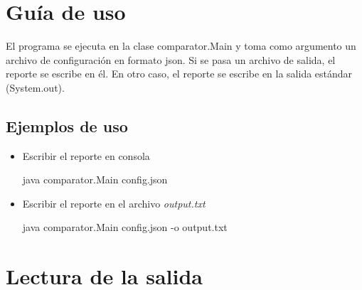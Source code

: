 \documentclass[11pt]{article}
\begin{document}
       \section{Guía de uso}

       El programa se ejecuta en la clase comparator.Main y toma como argumento un archivo de configuración en formato json. Si se pasa un archivo de salida, el reporte se escribe en él. En otro caso, el reporte se escribe en la salida estándar (System.out).

       \subsection{Ejemplos de uso}

       \begin{itemize}
              \item Escribir el reporte en consola
                     \begin{verbatim*}java comparator.Main config.json\end{verbatim*}
              \item Escribir el reporte en el archivo \textit{output.txt}
                     \begin{verbatim*}java comparator.Main config.json -o output.txt\end{verbatim*}
       \end{itemize}


       \section{Lectura de la salida}
\end{document}
